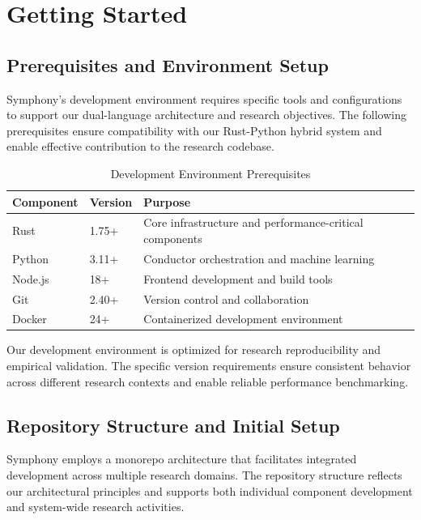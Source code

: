 \section*{Getting Started}

\subsection*{Prerequisites and Environment Setup}

Symphony's development environment requires specific tools and configurations to support our dual-language architecture and research objectives. The following prerequisites ensure compatibility with our Rust-Python hybrid system and enable effective contribution to the research codebase.

\begin{table}[ht]
\centering
\begin{tabular}{@{}lll@{}}
\toprule
\textbf{Component} & \textbf{Version} & \textbf{Purpose} \\
\midrule
Rust & 1.75+ & Core infrastructure and performance-critical components \\
Python & 3.11+ & Conductor orchestration and machine learning \\
Node.js & 18+ & Frontend development and build tools \\
Git & 2.40+ & Version control and collaboration \\
Docker & 24+ & Containerized development environment \\
\bottomrule
\end{tabular}
\caption{Development Environment Prerequisites}
\end{table}

\begin{infobox}[title=Research Environment Considerations]
Our development environment is optimized for research reproducibility and empirical validation. The specific version requirements ensure consistent behavior across different research contexts and enable reliable performance benchmarking.
\end{infobox}

\subsection*{Repository Structure and Initial Setup}

Symphony employs a monorepo architecture that facilitates integrated development across multiple research domains. The repository structure reflects our architectural principles and supports both individual component development and system-wide research activities.

